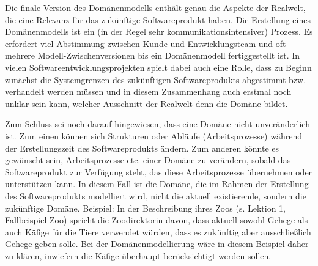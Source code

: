 Die finale Version des Domänenmodells enthält genau die Aspekte der Realwelt, die eine Relevanz für das zukünftige Softwareprodukt haben. Die Erstellung eines Domänenmodells ist ein (in der Regel sehr kommunikationsintensiver) Prozess. Es erfordert viel Abstimmung zwischen Kunde und Entwicklungsteam und oft mehrere Modell-Zwischen\-ver\-sionen bis ein Domänenmodell fertiggestellt ist. In vielen Softwareentwicklungsprojekten spielt dabei auch eine Rolle, dass zu Beginn zunächst die Systemgrenzen des zukünftigen Softwareprodukts abgestimmt bzw. verhandelt werden müssen und in diesem Zusammenhang auch erstmal noch unklar sein kann, welcher Ausschnitt der Realwelt denn die Domäne bildet.

Zum Schluss sei noch darauf hingewiesen, dass eine Domäne nicht unveränderlich ist. Zum einen können sich Strukturen oder Abläufe (\zb Arbeitsprozesse) während der Erstellungszeit des Softwareprodukts ändern. Zum anderen könnte es gewünscht sein, Arbeitsprozesse etc. einer Domäne zu verändern, sobald das Softwareprodukt zur Verfügung steht, das diese Arbeitsprozesse übernehmen oder unterstützen kann. In diesem Fall ist die Domäne, die im Rahmen der Erstellung des Softwareprodukts modelliert wird, nicht die aktuell existierende, sondern die zukünftige Domäne. Beispiel: In der Beschreibung ihres Zoos (s. Lektion 1, Fallbeispiel Zoo) spricht die Zoodirektorin davon, dass aktuell sowohl Gehege als auch Käfige für die Tiere verwendet würden, dass es zukünftig aber ausschließlich Gehege geben solle. Bei der Domänenmodellierung wäre in diesem Beispiel daher zu klären, inwiefern die Käfige überhaupt berücksichtigt werden sollen.